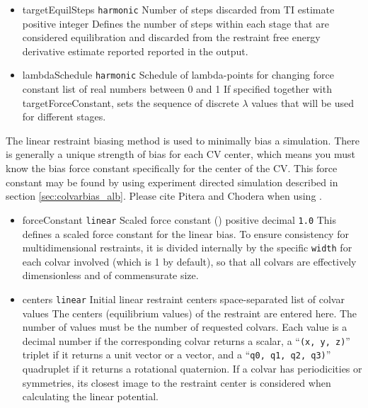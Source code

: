 \begin{itemize}
\item %
  \key
    {targetEquilSteps}{%
    \texttt{harmonic}}{%
    Number of steps discarded from TI estimate}{%
    positive integer}{%
    Defines the number of steps within each stage that are considered
    equilibration and discarded from the restraint free energy derivative
    estimate reported reported in the output.}

\item %
  \key
    {lambdaSchedule}{%
    \texttt{harmonic}}{%
    Schedule of lambda-points for changing force constant}{%
    list of real numbers between 0 and 1}{%
    If specified together with targetForceConstant, sets the sequence of
    discrete $\lambda$ values that will be used for different stages.
  }

\end{itemize}

\label{sec:colvarbias_linear}

The linear restraint biasing method is used to minimally bias a
simulation. There is generally a unique strength of bias for each CV
center, which means you must know the bias force constant specifically
for the center of the CV. This force constant may be found by using
experiment directed simulation described in
section \ref{sec:colvarbias_alb}. Please cite Pitera and Chodera when
using \cite{Pitera2012}.

\begin{itemize}

\item %
  \keydef
    {forceConstant}{%
    \texttt{linear}}{%
    Scaled force constant ()}{%
    positive decimal}{%
    \texttt{1.0}}{%
    This defines a scaled force constant for the linear bias.
    To ensure consistency for multidimensional restraints, it is
    divided internally by  the specific \texttt{width}
    for each colvar involved (which is 1 by default), so that all colvars
    are effectively dimensionless and of commensurate size.}

\item %
  \key
    {centers}{%
    \texttt{linear}}{%
    Initial linear restraint centers}{%
    space-separated list of colvar values}{%
    The centers (equilibrium values) of the restraint are entered here.
    The number of values must be the number of requested colvars.
    Each value is a decimal number if the corresponding colvar returns
    a scalar, a ``\texttt{(x, y, z)}'' triplet if it returns a unit
    vector or a vector, and a ``\texttt{q0, q1, q2, q3)}'' quadruplet
    if it returns a rotational quaternion.  If a colvar has
    periodicities or symmetries, its closest image to the restraint
    center is considered when calculating the linear potential.}
\end{itemize}

